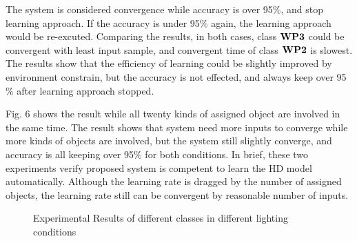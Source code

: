 \documentclass[journal]{IEEEtran}
\begin{document}
The system is considered convergence while accuracy is over 95$\%$, and stop learning approach. If the accuracy is under 95$\%$ again, the learning approach would be re-excuted. Comparing the results, in both cases, class $\bf{WP3}$ could be convergent with least input sample, and convergent time of class $\bf{WP2}$ is slowest. The results show that the efficiency of learning could be slightly improved by environment constrain, but the accuracy is not effected, and always keep over 95$\%$ after learning approach stopped. 
 
Fig. 6 shows the result while all twenty kinds of assigned object are involved in the same time. The result shows that system need more inputs to converge while more kinds of objects are involved, but the system still slightly converge, and accuracy is all keeping over 95$\%$ for both conditions. In brief, these two experiments verify proposed system is competent to learn the HD model automatically. Although the learning rate is dragged by the number of assigned objects, the learning rate still can be convergent by reasonable number of inputs. 


 
\begin{figure}[!t]
\centering


\caption{Experimental Results of different classes in different lighting conditions}

\end{figure}
\end{document}
